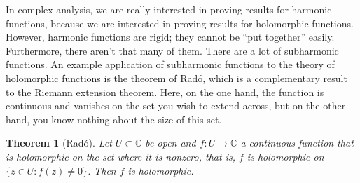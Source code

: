 \documentclass[12pt,openany]{book}
\newcommand{\C}{{\mathbb{C}}}
\newcommand{\myquote}[1]{``#1''}
\theoremstyle{plain}
\newtheorem{thm}{Theorem}[section]
\theoremstyle{remark}
\theoremstyle{definition}
\theoremstyle{exercise}
\theoremstyle{example}
\begin{document}
In complex analysis,
we are really interested in proving results for harmonic functions,
because we are interested in proving results for holomorphic functions.
However, harmonic functions are rigid; they cannot be
\myquote{put together} easily.
Furthermore, there aren't that many of them.  There are a lot of
subharmonic functions.
An example application of subharmonic functions to
the theory of holomorphic functions is the theorem of 
Rad\'o, which is a complementary result to the
\hyperref[thm:riemannext]{Riemann extension theorem}.
Here, on the one hand, the function is
continuous and vanishes on the set you wish to extend across, but on the
other hand, you know nothing about the size of this set.

\begin{thm}[Rad\'o]\label{thm:rado}
Let $U \subset \C$ be open and $f \colon U \to \C$ a continuous
function that is holomorphic on the set where it is nonzero, that is,
$f$ is holomorphic on $\bigl\{ z \in U : f(z) \neq 0 \bigr\}$.
Then $f$ is holomorphic.
\end{thm}
\end{document}
